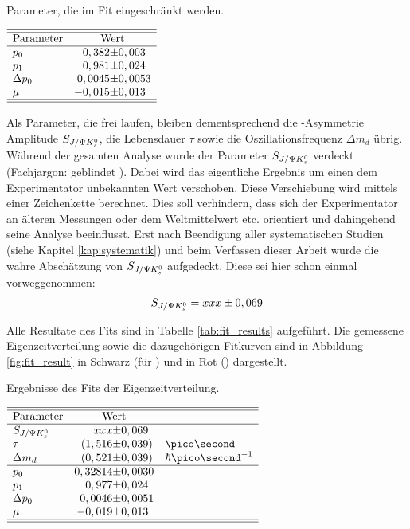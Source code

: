 \begin{table}[hptb]
\centering
\caption{Parameter, die im Fit eingeschränkt werden.}
\label{tab:constrained_parameters}
$\begin{array}{l r@{\pm}l }
\hline 
\hline
\text{Parameter} & \multicolumn{2}{c}{\text{Wert}}\\
\hline
p_0 & 0,382 & 0,003 \\
p_1 & 0,981 & 0,024 \\
\Delta p_0 & 0,0045 & 0,0053 \\
\mu & -0,015 & 0,013 \\ \hline \hline
\end{array}$ 
\end{table}

Als Parameter, die frei laufen, bleiben dementsprechend die \CP-Asymmetrie Amplitude $S_{J/\Psi K_s^0}$, die Lebensdauer $\tau$ sowie die Oszillationsfrequenz $\Delta m_d$ übrig. Während der gesamten Analyse wurde der Parameter $S_{J/\Psi K_s^0}$ verdeckt (Fachjargon: \glqq geblindet \grqq). Dabei wird das eigentliche Ergebnis um einen dem Experimentator unbekannten Wert verschoben. Diese Verschiebung wird mittels einer Zeichenkette berechnet. Dies soll verhindern, dass sich der Experimentator an älteren Messungen oder dem Weltmittelwert etc. orientiert und dahingehend seine Analyse beeinflusst. Erst nach Beendigung aller systematischen Studien (siehe Kapitel \ref{kap:systematik}) und beim Verfassen dieser Arbeit wurde die wahre Abschätzung von $S_{J/\Psi K_s^0}$ aufgedeckt. Diese sei hier schon einmal vorweggenommen:
\begin{align}
S_{J/\Psi K_s^0} = xxx \pm 0,069     \label{eq:fit_result}
\end{align}

Alle Resultate des Fits sind in Tabelle \ref{tab:fit_results} aufgeführt. Die gemessene Eigenzeitverteilung sowie die dazugehörigen Fitkurven sind in Abbildung \ref{fig:fit_result} in Schwarz (für \Bd) und in Rot (\Bdbar) dargestellt.

\begin{table}[hptb]
\centering
\caption{Ergebnisse des Fits der Eigenzeitverteilung.}
\label{tab:fit_results}
$\begin{array}{l r@{\pm}l l}
\hline 
\hline
\text{Parameter} & \multicolumn{2}{c}{\text{Wert}}\\
\hline
\SJPsi & xxx & 0,069 &\\
\tau & (1,516 & 0,039) & \ps\\
\Delta m_d & (0,521 & 0,039) & \hbar\ps^{-1} \\ \hline
p_0 & 0,32814 & 0,0030 & \\
p_1 & 0,977 & 0,024 &\\
\Delta p_0 & 0,0046 & 0,0051 &\\
\mu & -0,019 & 0,013 &\\ \hline \hline
\end{array}$ 
\end{table}

